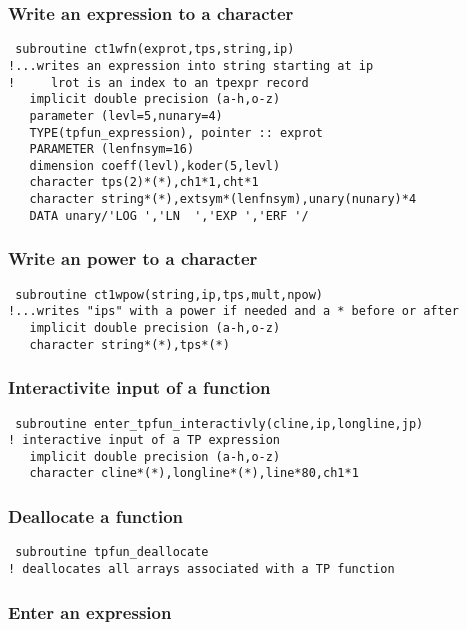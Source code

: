 \documentclass[12pt]{article}
\begin{document}
\subsubsection{Write an expression to a character}

\begin{verbatim}
 subroutine ct1wfn(exprot,tps,string,ip)
!...writes an expression into string starting at ip
!     lrot is an index to an tpexpr record
   implicit double precision (a-h,o-z)
   parameter (levl=5,nunary=4)
   TYPE(tpfun_expression), pointer :: exprot
   PARAMETER (lenfnsym=16)
   dimension coeff(levl),koder(5,levl)
   character tps(2)*(*),ch1*1,cht*1
   character string*(*),extsym*(lenfnsym),unary(nunary)*4
   DATA unary/'LOG ','LN  ','EXP ','ERF '/
\end{verbatim}

\subsubsection{Write an power to a character}

\begin{verbatim}
 subroutine ct1wpow(string,ip,tps,mult,npow)
!...writes "ips" with a power if needed and a * before or after
   implicit double precision (a-h,o-z)
   character string*(*),tps*(*)
\end{verbatim}

\subsubsection{Interactivite input of a function}

\begin{verbatim}
 subroutine enter_tpfun_interactivly(cline,ip,longline,jp)
! interactive input of a TP expression
   implicit double precision (a-h,o-z)
   character cline*(*),longline*(*),line*80,ch1*1
\end{verbatim}

\subsubsection{Deallocate a function}

\begin{verbatim}
 subroutine tpfun_deallocate
! deallocates all arrays associated with a TP function
\end{verbatim}

\subsubsection{Enter an expression}
\end{document}
